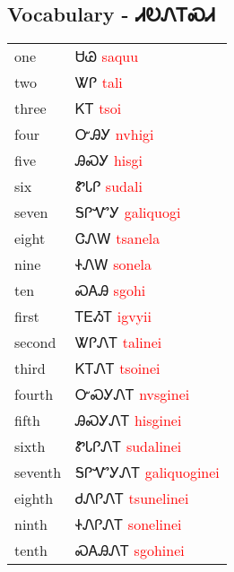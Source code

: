 \subsection{Vocabulary - ᏗᎧᏁᎢᏍᏗ 
}
\begin{tabular}{p{3cm} p{11cm}}
one & ᏌᏊ 
 \newline \textcolor{red}{saquu}\\
two & ᏔᎵ 
 \newline \textcolor{red}{tali}\\
three & ᏦᎢ 
 \newline \textcolor{red}{tsoi}\\
four & ᏅᎯᎩ 
 \newline \textcolor{red}{nvhigi}\\
five & ᎯᏍᎩ 
 \newline \textcolor{red}{hisgi}\\
six & ᏑᏓᎵ 
 \newline \textcolor{red}{sudali}\\
seven & ᎦᎵᏉᎩ 
 \newline \textcolor{red}{galiquogi}\\
eight & ᏣᏁᎳ 
 \newline \textcolor{red}{tsanela}\\
nine & ᏐᏁᎳ 
 \newline \textcolor{red}{sonela}\\
ten & ᏍᎪᎯ 
 \newline \textcolor{red}{sgohi}\\
first & ᎢᎬᏱᎢ 
 \newline \textcolor{red}{igvyii}\\
second & ᏔᎵᏁᎢ 
 \newline \textcolor{red}{talinei}\\
third & ᏦᎢᏁᎢ 
 \newline \textcolor{red}{tsoinei}\\
fourth & ᏅᏍᎩᏁᎢ 
 \newline \textcolor{red}{nvsginei}\\
fifth & ᎯᏍᎩᏁᎢ 
 \newline \textcolor{red}{hisginei}\\
sixth & ᏑᏓᎵᏁᎢ 
 \newline \textcolor{red}{sudalinei}\\
seventh & ᎦᎵᏉᎩᏁᎢ 
 \newline \textcolor{red}{galiquoginei}\\
eighth & ᏧᏁᎵᏁᎢ 
 \newline \textcolor{red}{tsunelinei}\\
ninth & ᏐᏁᎵᏁᎢ 
 \newline \textcolor{red}{sonelinei}\\
tenth & ᏍᎪᎯᏁᎢ 
 \newline \textcolor{red}{sgohinei}\\
\end{tabular}

